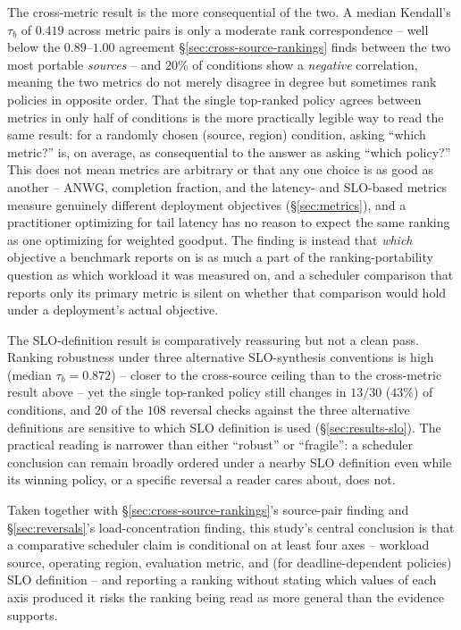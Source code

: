 \documentclass[sn-basic,Numbered,pdflatex]{sn-jnl}
\begin{document}
The cross-metric result is the more consequential of the two. A median
Kendall's $\tau_b$ of $0.419$ across metric pairs is only a moderate rank
correspondence -- well below the $0.89$--$1.00$ agreement
\S\ref{sec:cross-source-rankings} finds between the two most portable
\emph{sources} -- and $20\%$ of conditions show a \emph{negative}
correlation, meaning the two metrics do not merely disagree in degree but
sometimes rank policies in opposite order. That the single top-ranked
policy agrees between metrics in only half of conditions is the more
practically legible way to read the same result: for a randomly chosen
(source, region) condition, asking ``which metric?'' is, on average, as
consequential to the answer as asking ``which policy?'' This does not mean
metrics are arbitrary or that any one choice is as good as another -- ANWG,
completion fraction, and the latency- and SLO-based metrics measure
genuinely different deployment objectives (\S\ref{sec:metrics}), and a
practitioner optimizing for tail latency has no reason to expect the same
ranking as one optimizing for weighted goodput. The finding is instead that
\emph{which} objective a benchmark reports on is as much a part of the
ranking-portability question as which workload it was measured on, and a
scheduler comparison that reports only its primary metric is silent on
whether that comparison would hold under a deployment's actual objective.

The SLO-definition result is comparatively reassuring but not a clean
pass. Ranking robustness under three alternative SLO-synthesis conventions
is high (median $\tau_b = 0.872$) -- closer to the cross-source ceiling
than to the cross-metric result above -- yet the single top-ranked policy
still changes in $13/30$ ($43\%$) of conditions, and $20$ of the $108$
reversal checks against the three alternative definitions
are sensitive to which SLO definition is used
(\S\ref{sec:results-slo}). The practical reading is narrower than either
``robust'' or ``fragile'': a scheduler conclusion can remain broadly
ordered under a nearby SLO definition even while its winning policy, or a
specific reversal a reader cares about, does not.

Taken together with \S\ref{sec:cross-source-rankings}'s source-pair finding
and \S\ref{sec:reversals}'s load-concentration finding, this study's central
conclusion is that a comparative scheduler claim is conditional on at least
four axes -- workload source, operating region, evaluation metric, and (for
deadline-dependent policies) SLO definition -- and reporting a ranking
without stating which values of each axis produced it risks the ranking
being read as more general than the evidence supports.
\end{document}
